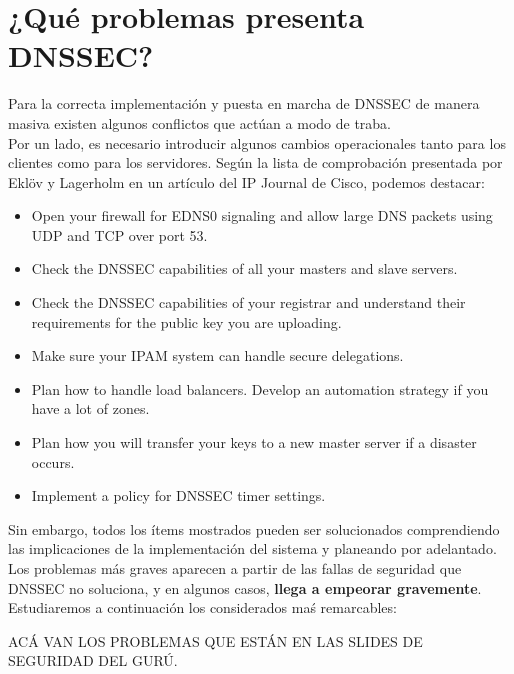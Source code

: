 \chapter{¿Qu\'e problemas presenta DNSSEC?}
Para la correcta implementaci\'on y puesta en marcha de DNSSEC de manera masiva existen algunos conflictos que act\'uan a modo de traba.\\
Por un lado, es necesario introducir algunos cambios operacionales tanto para los clientes como para los servidores. Seg\'un la lista de comprobaci\'on presentada por Ekl\"{o}v y Lagerholm en un art\'iculo del IP Journal de Cisco\cite{imp2011}, podemos destacar:
\begin{itemize}
 \item Open your firewall for EDNS0 signaling and allow large DNS packets using UDP and TCP over port 53.
 \item Check the DNSSEC capabilities of all your masters and slave servers.
 \item Check the DNSSEC capabilities of your registrar and understand their requirements for the public key you are uploading.
 \item Make sure your IPAM system can handle secure delegations.
 \item Plan how to handle load balancers. Develop an automation strategy if you have a lot of zones.
 \item Plan how you will transfer your keys to a new master server if a disaster occurs.
 \item Implement a policy for DNSSEC timer settings.
\end{itemize}

Sin embargo, todos los \'items mostrados pueden ser solucionados comprendiendo las implicaciones de la implementaci\'on del sistema y planeando por adelantado. Los problemas m\'as graves aparecen a partir de las fallas de seguridad que DNSSEC no soluciona, y en algunos casos, \textbf{llega a empeorar gravemente}. Estudiaremos a continuaci\'on los considerados maś remarcables:

ACÁ VAN LOS PROBLEMAS QUE ESTÁN EN LAS SLIDES DE SEGURIDAD DEL GURÚ.